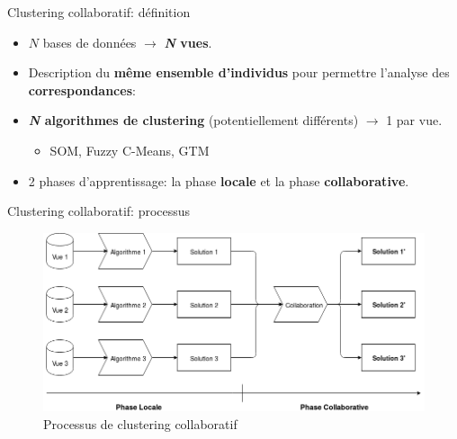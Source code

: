 \documentclass[hyperref={pdfpagelabels=false}]{beamer}
\begin{document}
    \begin{frame}{Clustering collaboratif: définition}
        \begin{itemize}
            \item<+-> $N$ bases de données $\rightarrow$ \textbf{\textit{N} 
                vues}.
            \item<+-> Description du \textbf{même ensemble d'individus} pour 
                permettre l'analyse des \textbf{correspondances}:
            \item<+-> \textbf{\textit{N} algorithmes de clustering} 
                (potentiellement différents) $\rightarrow$ 1 par vue.
                \begin{itemize}
                    \item SOM, Fuzzy C-Means, GTM
                \end{itemize}
            \item<+-> 2 phases d'apprentissage: la phase \textbf{locale} et la 
                phase \textbf{collaborative}.
        \end{itemize}

    \end{frame}

    \begin{frame}{Clustering collaboratif: processus}
        \begin{figure}[b]
            \centering
            \includegraphics[scale=.35]{cc_resume}
            \caption{Processus de clustering collaboratif}
        \end{figure}
    \end{frame}
\end{document}
